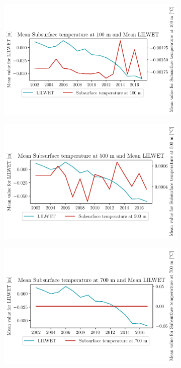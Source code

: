 \documentclass[../main.tex]{subfiles}
\begin{document}
\begin{figure}[hbt!]
    \centering
    \begin{subfigure}[b]{0.45\textwidth}
    \includegraphics[width=\textwidth]{images/2021w5/chapter7/hres/tiemseries_subsurtemp_100_LIC}
    \end{subfigure}
    \begin{subfigure}[b]{0.45\textwidth}
    \includegraphics[width=\textwidth]{images/2021w5/chapter7/hres/tiemseries_subsurtemp_500_LIC}
    \end{subfigure}
    \begin{subfigure}[b]{0.45\textwidth}
    \includegraphics[width=\textwidth]{images/2021w5/chapter7/hres/tiemseries_subsurtemp_700_LIC}

\end{subfigure}
\end{figure}
\end{document}
